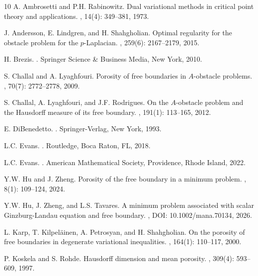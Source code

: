 \documentclass[onecolumn]{autart}
\begin{document}
\begin{thebibliography}{10}
A. Ambrosetti and P.H. Rabinowitz.
\newblock Dual variational methods in critical point theory and applications.
, 14(4): 349--381, 1973.

J. Andersson, E. Lindgren, and H. Shahgholian.
\newblock Optimal regularity for the obstacle problem for the $p$-Laplacian.
, 259(6): 2167--2179, 2015.

H. Brezis.
.
\newblock Springer Science \& Business Media, New York, 2010.

S. Challal and A. Lyaghfouri.
\newblock Porosity of free boundaries in $A$-obstacle problems.
, 70(7): 2772--2778, 2009.

S. Challal, A. Lyaghfouri, and J.F. Rodrigues.
\newblock On the $A$-obstacle problem and the Hausdorff measure of its free boundary.
, 191(1): 113--165, 2012.

E. DiBenedetto.
.
\newblock Springer-Verlag, New York, 1993.

L.C. Evans.
.
\newblock Routledge, Boca Raton, FL, 2018.

L.C. Evans.
.
\newblock American Mathematical Society, Providence, Rhode Island, 2022.

Y.W. Hu and J. Zheng.
\newblock Porosity of the free boundary in a minimum problem.
, 8(1): 109--124, 2024.

Y.W. Hu, J. Zheng, and L.S. Tavares.
\newblock A minimum problem associated with scalar Ginzburg-Landau equation and free boundary.
,
\newblock DOI: 10.1002/mana.70134, 2026.

L. Karp, T. Kilpel\"ainen, A. Petrosyan, and H. Shahgholian.
\newblock On the porosity of free boundaries in degenerate variational inequalities.
, 164(1): 110--117, 2000.

P. Koskela and S. Rohde.
\newblock Hausdorff dimension and mean porosity.
, 309(4): 593--609, 1997.


\end{thebibliography}
\end{document}
